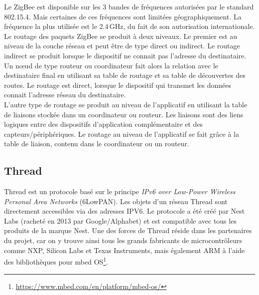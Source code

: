 Le ZigBee est disponible sur les 3 bandes de fréquences autorisées par le standard 802.15.4. Mais certaines de ces fréquences sont limitées géographiquement. La fréquence la plus utilisée est le 2.4\,GHz, du fait de son autorisation internationale. \\


Le routage des paquets ZigBee se produit à deux niveaux\cite{ZigBeeW24:online}. Le premier est au niveau de la couche réseau et peut être de type direct ou indirect. Le routage indirect se produit lorsque le dispositif ne connait pas l'adresse du destinataire. Un n\oe ud de type routeur ou coordinateur fait alors la relation avec le destinataire final en utilisant sa table de routage et sa table de découvertes des routes. Le routage est direct, lorsque le dispositif qui transmet les données connait l'adresse réseau du destinataire.  \\

L'autre type de routage se produit au niveau de l'applicatif en utilisant la table de liaisons stockée dans un coordinateur ou routeur. Les liaisons sont des liens logiques entre des dispositifs d'application complémentaire et des capteurs/périphériques. Le routage au niveau de l'applicatif se fait grâce à la table de liaison, contenu dans le coordinateur ou un routeur. \\

\subsection{Thread}
\label{sec-thread_protocol}

Thread est un protocole basé sur le principe \textit{IPv6 over Low-Power Wireless Personal Area Networks} (6LowPAN)\cite{6LoWPANW35:online}. Les objets d'un réseau Thread sont directement accessibles via des adresses IPV6. Le protocole a été créé par Nest Labs (racheté en 2013 par Google/Alphabet)\cite{Threadne85:online} et est compatible avec tous les produits de la marque Nest. Une des forces de Thread réside dans les partenaires du projet, car on y trouve ainsi tous les grands fabricants de microcontrôleurs comme NXP, Silicon Labs et Texas Instruments, mais également ARM à l'aide des bibliothèques pour mbed OS\footnote{\url{https://www.mbed.com/en/platform/mbed-os/}}. \\

